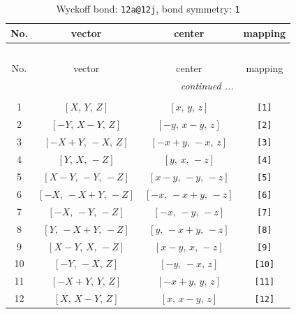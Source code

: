 \documentclass[fleqn,8pt]{jsarticle}
\begin{document}
\begin{longtable}{cccc}
\caption{Wyckoff bond: {\tt 12a@12j}, bond symmetry: {\tt 1}}
 \\
 \hline \hline
No. & vector & center & mapping \\ \hline \endfirsthead

\multicolumn{3}{l}{\tablename\ \thetable{}} \\
 \hline \hline
No. & vector & center & mapping \\ \hline \endhead

 \hline \hline
\multicolumn{3}{r}{\footnotesize\it continued ...} \\ \endfoot

 \hline \hline
\multicolumn{3}{r}{} \\ \endlastfoot

1 & $\left[ X,\, Y,\, Z \right]$ & $\left[ x,\, y,\, z \right]$ & {\tt [1]} \\ \hline
2 & $\left[ - Y,\, X - Y,\, Z \right]$ & $\left[ - y,\, x - y,\, z \right]$ & {\tt [2]} \\ \hline
3 & $\left[ - X + Y,\, - X,\, Z \right]$ & $\left[ - x + y,\, - x,\, z \right]$ & {\tt [3]} \\ \hline
4 & $\left[ Y,\, X,\, - Z \right]$ & $\left[ y,\, x,\, - z \right]$ & {\tt [4]} \\ \hline
5 & $\left[ X - Y,\, - Y,\, - Z \right]$ & $\left[ x - y,\, - y,\, - z \right]$ & {\tt [5]} \\ \hline
6 & $\left[ - X,\, - X + Y,\, - Z \right]$ & $\left[ - x,\, - x + y,\, - z \right]$ & {\tt [6]} \\ \hline
7 & $\left[ - X,\, - Y,\, - Z \right]$ & $\left[ - x,\, - y,\, - z \right]$ & {\tt [7]} \\ \hline
8 & $\left[ Y,\, - X + Y,\, - Z \right]$ & $\left[ y,\, - x + y,\, - z \right]$ & {\tt [8]} \\ \hline
9 & $\left[ X - Y,\, X,\, - Z \right]$ & $\left[ x - y,\, x,\, - z \right]$ & {\tt [9]} \\ \hline
10 & $\left[ - Y,\, - X,\, Z \right]$ & $\left[ - y,\, - x,\, z \right]$ & {\tt [10]} \\ \hline
11 & $\left[ - X + Y,\, Y,\, Z \right]$ & $\left[ - x + y,\, y,\, z \right]$ & {\tt [11]} \\ \hline
12 & $\left[ X,\, X - Y,\, Z \right]$ & $\left[ x,\, x - y,\, z \right]$ & {\tt [12]} \\
\end{longtable}
\end{document}

